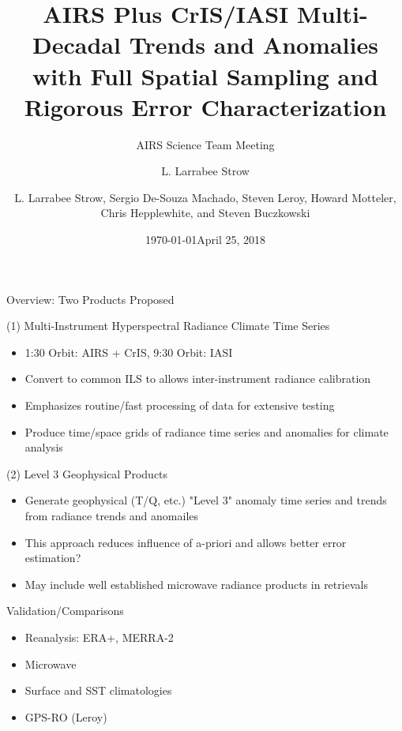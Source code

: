 \documentclass[10pt,t]{beamer}
\author{L. Larrabee Strow}
\date{\today}
\title{\large AIRS Plus CrIS/IASI Multi-Decadal Trends and Anomalies with Full Spatial Sampling and Rigorous Error Characterization}
\subtitle{\footnotesize{AIRS Science Team Meeting}}
\date{\vspace{0.1in}\footnotesize{April 25, 2018 \vfill}}
\author{L. Larrabee Strow\inst{1,2}, Sergio De-Souza Machado\inst{1,2}, Steven Leroy\inst{3}, Howard Motteler\inst{2}, Chris Hepplewhite\inst{2}, and Steven Buczkowski\inst{2}}
\institute[UMBC]{\inst{1} UMBC Physics Dept. \and \inst{2}UMBC JCET \and \inst{3} AER}
\begin{document}
\maketitle
{}

\begin{frame}[shrink=20,label={sec:org64ea7ca}]{Overview:  Two Products Proposed}
\vspace{-0.1in}
\begin{block}{(1) Multi-Instrument Hyperspectral Radiance Climate Time Series}
\begin{itemize}
\item 1:30 Orbit: AIRS + CrIS, 9:30 Orbit: IASI
\item Convert to common ILS to allows inter-instrument radiance calibration
\item Emphasizes routine/fast processing of data for extensive testing
\item Produce time/space grids of radiance time series and anomalies for climate analysis
\end{itemize}
\end{block}

\begin{block}{(2) Level 3 Geophysical Products}
\begin{itemize}
\item Generate geophysical (T/Q, etc.) "Level 3" anomaly time series and trends from radiance trends and anomailes
\item This approach reduces influence of a-priori and allows better error estimation?
\item May include well established microwave radiance products in retrievals
\end{itemize}
\end{block}

\begin{block}{Validation/Comparisons}
\begin{itemize}
\item Reanalysis: ERA+, MERRA-2
\item Microwave
\item Surface and SST climatologies
\item GPS-RO (Leroy)
\end{itemize}
\end{block}
\end{frame}
\end{document}
